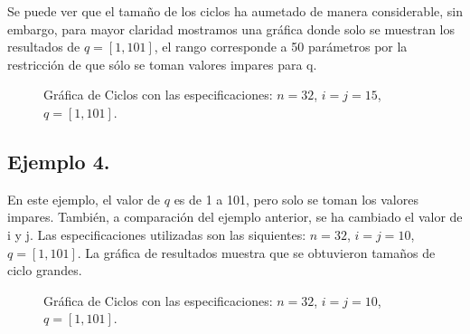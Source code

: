 \documentclass[12pt,3p]{elsarticle}
\begin{document}
Se puede ver que el tamaño de los ciclos ha aumetado de manera considerable, sin embargo, para mayor claridad mostramos una gráfica donde solo se muestran los resultados de $q=[1,101]$, el rango corresponde a 50 parámetros por la restricción de que sólo se toman valores impares para q.

\begin{figure}[H]
\centering
{}
\caption{Gráfica de Ciclos con las especificaciones:  $ n=32$, $ i=j=15$, $ q=[1,101]$.} \label{Param3}
\end{figure}


\subsection{Ejemplo 4. }
En este ejemplo, el valor de $q$ es de 1 a 101, pero solo se toman los valores impares. También, a comparación del ejemplo anterior, se ha cambiado el valor de i y j. Las especificaciones utilizadas son las siquientes:  $ n=32$, $ i=j=10$, $ q=[1,101]$. La gráfica de resultados muestra que se obtuvieron tamaños de ciclo grandes.



\begin{figure}[H]
\centering
{}
\caption{Gráfica de Ciclos con las especificaciones:  $ n=32$, $ i=j=10$, $ q=[1,101]$.} \label{Param4}
\end{figure}
\end{document}
